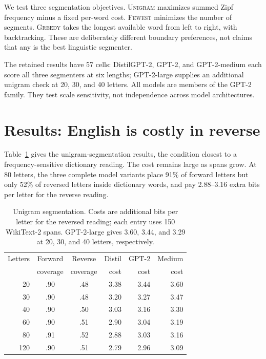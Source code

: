 \documentclass[11pt]{article}
\begin{document}
We test three segmentation objectives. \textsc{Unigram} maximizes summed Zipf
frequency minus a fixed per-word cost. \textsc{Fewest} minimizes the number of
segments. \textsc{Greedy} takes the longest available word from left to right,
with backtracking. These are deliberately different boundary preferences, not
claims that any is the best linguistic segmenter.

The retained results have 57 cells: DistilGPT-2, GPT-2, and GPT-2-medium
\citep{radford2019language} each score all three segmenters at six lengths;
GPT-2-large supplies an additional unigram check at 20, 30, and 40 letters.
All models are members of the GPT-2 family. They test scale sensitivity, not
independence across model architectures.

\section{Results: English is costly in reverse}
\label{sec:results}

Table~\ref{tab:unigram} gives the unigram-segmentation results, the condition
closest to a frequency-sensitive dictionary reading. The cost remains large as
spans grow. At 80 letters, the three complete model variants place 91\% of
forward letters but only 52\% of reversed letters inside dictionary words, and
pay 2.88--3.16 extra bits per letter for the reverse reading.

\begin{table}[t]
\centering
\small
\setlength{\tabcolsep}{3.2pt}
\begin{tabular}{rccrrr}
\toprule
Letters & Forward & Reverse & Distil & GPT-2 & Medium \\
 & coverage & coverage & cost & cost & cost \\
\midrule
20  & .90 & .48 & 3.38 & 3.44 & 3.60 \\
30  & .90 & .48 & 3.20 & 3.27 & 3.47 \\
40  & .90 & .50 & 3.03 & 3.16 & 3.30 \\
60  & .90 & .51 & 2.90 & 3.04 & 3.19 \\
80  & .91 & .52 & 2.88 & 3.03 & 3.16 \\
120 & .90 & .51 & 2.79 & 2.96 & 3.09 \\
\bottomrule
\end{tabular}
\caption{Unigram segmentation. Costs are additional bits per letter for the
reversed reading; each entry uses 150 WikiText-2 spans. GPT-2-large gives
3.60, 3.44, and 3.29 at 20, 30, and 40 letters, respectively.}
\label{tab:unigram}
\end{table}
\end{document}
